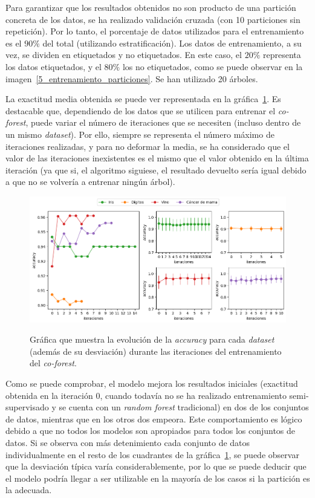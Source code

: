 \begin{itemize}
	Para garantizar que los resultados obtenidos no son producto de una partición concreta de los datos, se ha realizado validación cruzada (con 10 particiones sin repetición). Por lo tanto, el porcentaje de datos utilizados para el entrenamiento es el $90\%$ del total (utilizando estratificación). Los datos de entrenamiento, a su vez, se dividen en etiquetados y no etiquetados. En este caso, el $20\%$ representa los datos etiquetados, y el $80\%$ los no etiquetados, como se puede observar en la imagen~\ref{5_entrenamiento_particiones}. Se han utilizado 20 árboles.
	
	La exactitud media obtenida se puede ver representada en la gráfica~\ref{gr:cf_train-iterations}. Es destacable que, dependiendo de los datos que se utilicen para entrenar el \textit{co-forest}, puede variar el número de iteraciones que se necesiten (incluso dentro de un mismo \textit{dataset}). Por ello, siempre se representa el número máximo de iteraciones realizadas, y para no deformar la media, se ha considerado que el valor de las iteraciones inexistentes es el mismo que el valor obtenido en la última iteración (ya que si, el algoritmo siguiese, el resultado devuelto sería igual debido a que no se volvería a entrenar ningún árbol).
	
	\begin{figure}[h]
		\caption[\textit{Co-Forest}: resultados (iteraciones-entrenamiento)]{Gráfica que muestra la evolución de la \textit{accuracy} para cada \textit{dataset} (además de su desviación) durante las iteraciones del entrenamiento del \textit{co-forest}.}
		\centering
		\includegraphics[scale=0.55]{../img/memoria/5_coforest_score-iteraciones}
		\label{gr:cf_train-iterations}
	\end{figure}

	Como se puede comprobar, el modelo mejora los resultados iniciales (exactitud obtenida en la iteración $0$, cuando todavía no se ha realizado entrenamiento semi-supervisado y se cuenta con un \textit{random forest} tradicional) en dos de los conjuntos de datos, mientras que en los otros dos empeora. Este comportamiento es lógico debido a que no todos los modelos son apropiados para todos los conjuntos de datos. Si se observa con más detenimiento cada conjunto de datos individualmente en el resto de los cuadrantes de la gráfica~\ref{gr:cf_train-iterations}, se puede observar que la desviación típica varía considerablemente, por lo que se puede deducir que el modelo podría llegar a ser utilizable en la mayoría de los casos si la partición es la adecuada.


\end{itemize}
